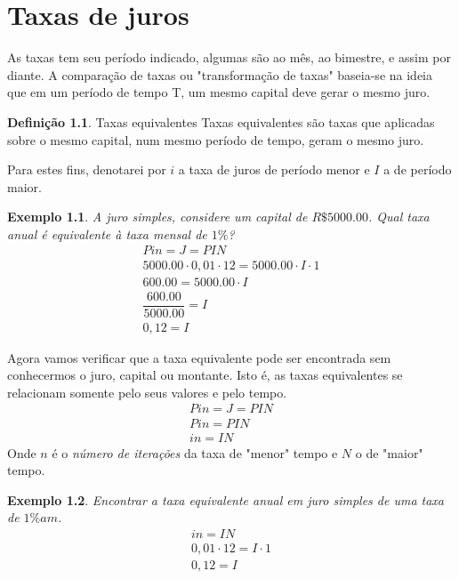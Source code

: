 \documentclass{book}
\theoremstyle{definition}
\newtheorem{definition}{Definição}
\theoremstyle{remark}
\theoremstyle{plain}
\theoremstyle{plain}
\theoremstyle{plain}
\theoremstyle{plain}
\newtheorem{example}{Exemplo}
\begin{document}
    \chapter{Taxas de juros}
    As taxas tem seu período indicado, algumas são ao mês, ao bimestre, e assim por diante. 
    A comparação de taxas ou "transformação de taxas" baseia-se na ideia que em um período
    de tempo T, um mesmo capital deve gerar o mesmo juro.
    \begin{definition}{Taxas equivalentes}
        Taxas equivalentes são taxas que aplicadas sobre o mesmo capital, num mesmo 
        período de tempo, geram o mesmo juro.
    \end{definition}
    Para estes fins, denotarei por $i$ a taxa de juros de período menor e $I$ a de período maior.
    \begin{example}
        A juro simples, considere um capital de $R\$ \num{5000.00}$. Qual taxa anual é equivalente à taxa mensal de $1\%$? \\
        \begin{align}
            P i n = J = P I N \\
            \num{5000.00} \cdot 0,01 \cdot 12 = \num{5000.00} \cdot I \cdot 1 \\
            \num{600.00} = \num{5000.00} \cdot I  \\
            \dfrac{\num{600.00}}{\num{5000.00}} = I \\
            0,12 = I 
        \end{align}
    \end{example}
    Agora vamos verificar que a taxa equivalente pode ser encontrada sem conhecermos o juro, capital ou montante.
    Isto é, as taxas equivalentes se relacionam somente pelo seus valores e pelo tempo.
    \begin{align}
        P i n = J = P I N \\
        P i n = P I N \\
        i n = I N
    \end{align}
    Onde $n$ é o \emph{número de iterações} da taxa de "menor" tempo e $N$ o de "maior" tempo.
    \begin{example}
        Encontrar a taxa equivalente anual em juro simples de uma taxa de $1\%am$. \\
        \begin{align}
            i n = I N \\
            0,01 \cdot 12 = I \cdot 1 \\
            0,12 = I
        \end{align}
    \end{example}
\end{document}
